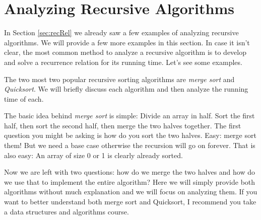\newpage

\section{Analyzing Recursive Algorithms}\label{sec:anaRecAlg}
In Section \ref{sec:recRel} we already saw a few examples of analyzing recursive algorithms.
We will provide a few more examples in this section. 
In case it isn't clear, the most common method to analyze a recursive algorithm is to develop
and solve a recurrence relation for its running time.  Let's see some examples.

The two most two popular recursive sorting algorithms
are {\em merge sort} and {\em Quicksort}. We will briefly discuss
each algorithm and then analyze the running time of each.

The basic idea behind {\em merge sort} is simple:
Divide an array in half. Sort the first half, then sort the
second half, then merge the two halves together.
The first question you might be asking is how do you sort the
two halves. Easy: merge sort them! But we need a base case
otherwise the recursion will go on forever. That is also easy:
An array of size 0 or 1 is clearly already sorted.

Now we are left with two questions: how do we merge the two 
halves and how do we use that to implement the entire algorithm?
Here we will simply provide both algorithms without much
explanation and we will focus on analyzing them. If you want to
better understand both merge sort and Quicksort, I recommend you 
take a data structures and algorithms course.

